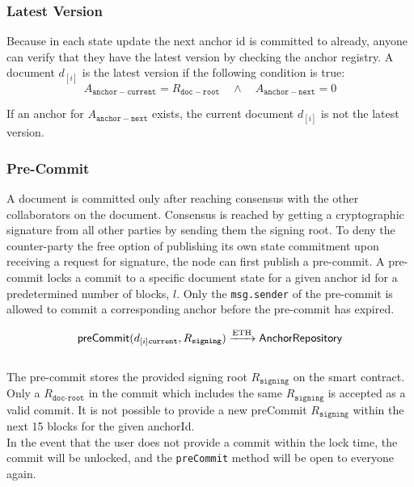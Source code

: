 \subsubsection{Latest Version}
Because in each state update the next anchor id is committed to already, anyone can verify that they have the latest version by checking the anchor registry. A document $d_{[i]}$ is the latest version if the following condition is true:
\begin{equation}
A_{\mathtt{anchor-current}} = R_{\mathtt{doc-root}} \quad \wedge \quad A_{\mathtt{anchor-next}} = 0
\end{equation}

If an anchor for $A_{\mathtt{anchor-next}}$ exists, the current document $d_{[i]}$ is not the latest version.

\subsubsection{Pre-Commit}
A document is committed only after reaching consensus with the other collaborators on the document. Consensus is reached by getting a cryptographic signature from all other parties by sending them the signing root. To deny the counter-party the free option  of publishing its own state commitment upon receiving a request for signature, the node can first publish a pre-commit.
A pre-commit locks a commit to a specific document state for a given anchor id for a predetermined number of blocks, $l$. Only the \texttt{msg.sender} of the pre-commit is allowed to commit a corresponding anchor before the pre-commit has expired.

\begin{equation}\\
    \mathsf{preCommit}(d_{[i]\texttt{current}},R_{\texttt{signing}}) \xrightarrow[]{\text{ETH}} \mathsf{AnchorRepository}
\end{equation}\\
The pre-commit stores the provided signing root $R_{\texttt{signing}}$ on the smart contract. Only a $R_{\texttt{doc-root}}$ in the commit which includes the same $R_{\texttt{signing}}$ is accepted as a valid commit. 
It is not possible to provide a new preCommit $R_{\texttt{signing}}$ within the next 15 blocks for the given anchorId.\\
In the event that the user does not provide a commit within the lock time, the commit will be unlocked, and the \texttt{preCommit} method will be open to everyone again.

